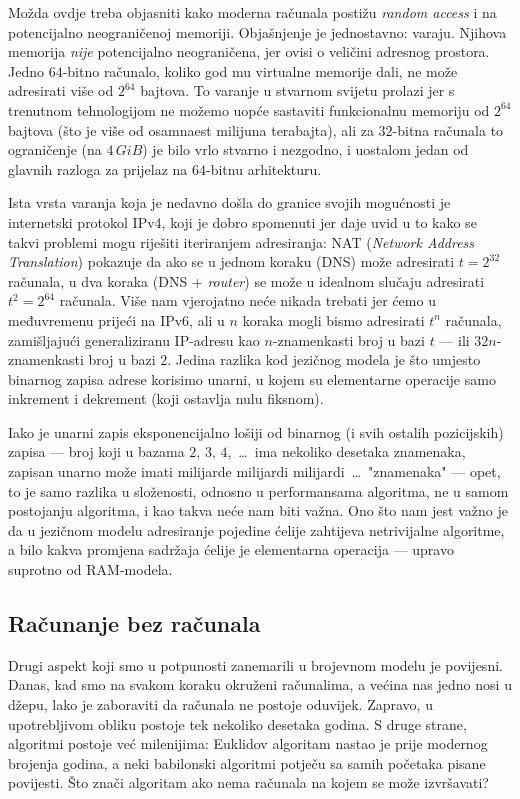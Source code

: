 Možda ovdje treba objasniti kako moderna računala postižu \emph{random access} i na potencijalno neograničenoj memoriji. Objašnjenje je jednostavno: varaju. Njihova memorija \emph{nije} potencijalno neograničena, jer ovisi o veličini adresnog prostora. Jedno $64$-bitno računalo, koliko god mu virtualne memorije dali, ne može adresirati više od $2^{64}$ bajtova. To varanje u stvarnom svijetu prolazi jer s trenutnom tehnologijom ne možemo uopće sastaviti funkcionalnu memoriju od $2^{64}$ bajtova (što je više od osamnaest milijuna terabajta), ali za $32$-bitna računala to ograničenje (na $4\,GiB$) je bilo vrlo stvarno i nezgodno, i uostalom jedan od glavnih razloga za prijelaz na $64$-bitnu arhitekturu.

Ista vrsta varanja koja je nedavno došla do granice svojih mogućnosti je internetski protokol IPv4, koji je dobro spomenuti jer daje uvid u to kako se takvi problemi mogu riješiti iteriranjem adresiranja: NAT (\emph{Network Address Translation}) pokazuje da ako se u jednom koraku (DNS) može adresirati $t=2^{32}$ računala, u dva koraka (DNS + \emph{router}) se može u idealnom slučaju adresirati $t^2=2^{64}$ računala. Više nam vjerojatno neće nikada trebati jer ćemo u međuvremenu prijeći na IPv6, ali u $n$ koraka mogli bismo adresirati $t^n$ računala, zamišljajući generaliziranu IP-adresu kao $n$-znamenkasti broj u bazi $t$ --- ili $32n$-znamenkasti broj u bazi $2$. Jedina razlika kod jezičnog modela je što umjesto binarnog zapisa adrese korisimo unarni, u kojem su elementarne operacije samo inkrement i dekrement (koji ostavlja nulu fiksnom).

Iako je unarni zapis eksponencijalno lošiji od binarnog (i svih ostalih pozicijskih) zapisa --- broj koji u bazama $2$, $3$, $4$,~\ldots\ ima nekoliko desetaka znamenaka, zapisan unarno može imati milijarde milijardi milijardi~\ldots\ "znamenaka" --- opet, to je samo razlika u složenosti, odnosno u performansama algoritma, ne u samom postojanju algoritma, i kao takva neće nam biti važna. Ono što nam jest važno je da u jezičnom modelu adresiranje pojedine ćelije zahtijeva netrivijalne algoritme, a bilo kakva promjena sadržaja ćelije je elementarna operacija --- upravo suprotno od RAM-modela.

\subsection{Računanje bez računala}

Drugi aspekt koji smo u potpunosti zanemarili u brojevnom modelu je povijesni. Danas, kad smo na svakom koraku okruženi računalima, a većina nas jedno nosi u džepu, lako je zaboraviti da računala ne postoje oduvijek. Zapravo, u upotrebljivom obliku postoje tek nekoliko desetaka godina. S druge strane, algoritmi postoje već milenijima: Euklidov algoritam nastao je prije modernog brojenja godina, a neki babilonski algoritmi potječu sa samih početaka pisane povijesti. Što znači algoritam ako nema računala na kojem se može izvršavati?

